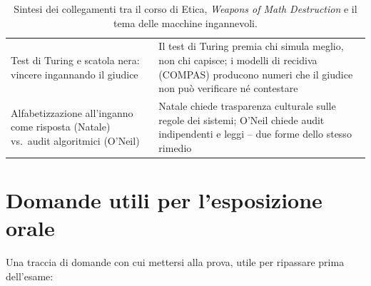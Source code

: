 \documentclass[a4paper,11pt]{article}
\begin{document}
\begin{table}[H]
\begin{tabular}{p{6cm}p{8.5cm}}
Test di Turing e scatola nera: vincere ingannando il giudice & Il test di Turing premia chi simula meglio, non chi capisce; i modelli di recidiva (COMPAS) producono numeri che il giudice non può verificare né contestare \\
Alfabetizzazione all'inganno come risposta (Natale) vs.\ audit algoritmici (O'Neil) & Natale chiede trasparenza culturale sulle regole dei sistemi; O'Neil chiede audit indipendenti e leggi -- due forme dello stesso rimedio \\
\bottomrule
\end{tabular}
\caption{Sintesi dei collegamenti tra il corso di Etica, \emph{Weapons of Math Destruction} e il tema delle macchine ingannevoli.}
\end{table}

\section{Domande utili per l'esposizione orale}

Una traccia di domande con cui mettersi alla prova, utile per ripassare prima dell'esame:
\end{document}
